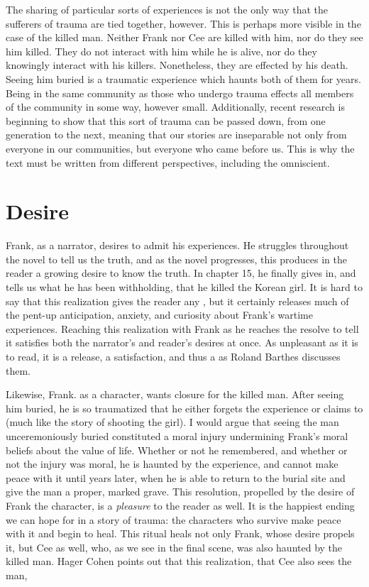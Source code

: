 \documentclass[12pt]{article}
\begin{document}
The sharing of particular sorts of experiences is not the only way that the
sufferers of trauma are tied together, however. This is perhaps more visible in
the case of the killed man. Neither Frank nor Cee are killed with him, nor do
they see him killed. They do not interact with him while he is alive, nor do
they knowingly interact with his killers. Nonetheless, they are effected by his
death. Seeing him buried is a traumatic experience which haunts both of them
for years. Being in the same community as those who undergo trauma effects all
members of the community in some way, however small. Additionally, recent
research is beginning to show that this sort of trauma can be passed down, from
one generation to the next,\autocite{dias,weathering} meaning that our stories
are inseparable not only from everyone in our communities, but everyone who
came before us. This is why the text must be written from different
perspectives, including the omniscient.

\section{Desire}

Frank, as a narrator, desires to admit his experiences. He struggles throughout
the novel to tell us the truth, and as the novel progresses, this produces in
the reader a growing desire to know the truth. In chapter
15,\autocite[p.~133]{home} he finally gives in, and tells us what he has been
withholding, that he killed the Korean girl. It is hard to say that this
realization gives the reader any , but it certainly releases much
of the pent-up anticipation, anxiety, and curiosity about Frank's wartime
experiences.  Reaching this realization with Frank as he reaches the resolve to
tell it satisfies both the narrator's and reader's desires at once. As
unpleasant as it is to read, it is a release, a satisfaction, and thus a
 as Roland Barthes discusses them.\autocite[p.
124]{narrative-medicine}

Likewise, Frank. as a character, wants closure for the killed man. After seeing
him buried, he is so traumatized that he either forgets the experience or
claims to (much like the story of shooting the girl).\autocite[p. 5-6]{home} I
would argue that seeing the man unceremoniously buried constituted a moral
injury undermining Frank's moral beliefs about the value of life. Whether or
not he remembered, and whether or not the injury was moral, he is haunted by
the experience, and cannot make peace with it until years later, when he is
able to return to the burial site and give the man a proper, marked grave. This
resolution, propelled by the desire of Frank the character, is a
\emph{pleasure} to the reader as well. It is the happiest ending we can hope
for in a story of trauma: the characters who survive make peace with it and
begin to heal. This ritual heals not only Frank, whose desire propels it, but
Cee as well, who, as we see in the final scene, was also haunted by the killed
man. Hager Cohen points out that this realization, that Cee also sees the man,
\autocite{point-of-return}
\end{document}
